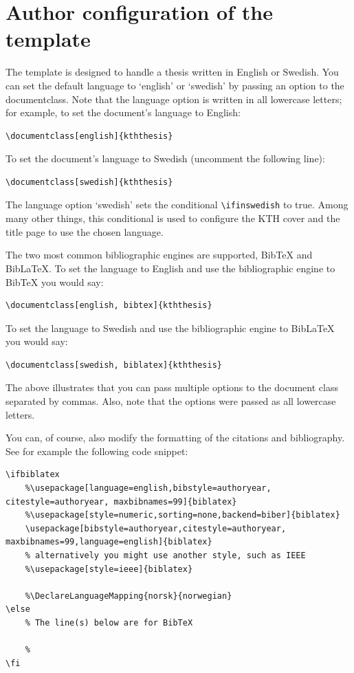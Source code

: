 \documentclass[examplethesis.tex]{subfiles}
\begin{document}
\section{Author configuration of the template}
\label{sec:authorConfigs}
The template is designed to handle a thesis written in English or Swedish.
You can set the default language to `english' or `swedish' by passing an option to the documentclass. Note that the language option is written in all lowercase letters; for example, to set the document's language to English:
\begin{lstlisting}[style=latexExampleForAuthors]
\documentclass[english]{kththesis}
\end{lstlisting}

To set the document's language to Swedish (uncomment the following line):
\begin{lstlisting}[style=latexExampleForAuthors]
\documentclass[swedish]{kththesis}
\end{lstlisting}

The language option `swedish' sets the conditional \texttt{\textbackslash ifinswedish} to true.  Among many other things, this conditional is used to configure the KTH cover and the title page to use the chosen language.

The two most common bibliographic engines are supported, \ie BibTeX and BibLaTeX. To set the language to English and use the bibliographic engine to BibTeX you would say:
\begin{lstlisting}[style=latexExampleForAuthors]
\documentclass[english, bibtex]{kththesis}
\end{lstlisting}
To set the language to Swedish and use the bibliographic engine to BibLaTeX you would say:
\begin{lstlisting}[style=latexExampleForAuthors]
\documentclass[swedish, biblatex]{kththesis}
\end{lstlisting}

The above illustrates that you can pass multiple options to the document class separated by commas. Also, note that the options were passed as all lowercase letters.

You can, of course, also modify the formatting of the citations and bibliography. See for example the following code snippet:

\begin{lstlisting}[style=latexExampleForAuthors]
\ifbiblatex
    %\usepackage[language=english,bibstyle=authoryear, citestyle=authoryear, maxbibnames=99]{biblatex}
    %\usepackage[style=numeric,sorting=none,backend=biber]{biblatex}
    \usepackage[bibstyle=authoryear,citestyle=authoryear, maxbibnames=99,language=english]{biblatex}
    % alternatively you might use another style, such as IEEE
    %\usepackage[style=ieee]{biblatex}
    
    %\DeclareLanguageMapping{norsk}{norwegian}
\else
    % The line(s) below are for BibTeX
    
    %
\fi
\end{lstlisting}
\end{document}
